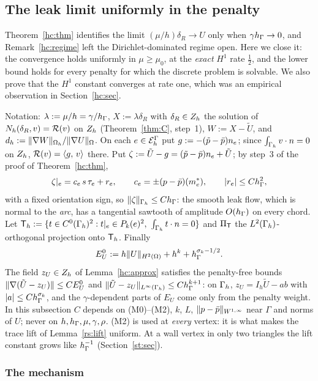 \subsection{The leak limit uniformly in the penalty}\label{u:sec}

Theorem~\ref{hc:thm} identifies the limit $(\mu/h)\delta_R\to U$ only when $\gamma h_\Gamma\to0$, and Remark~\ref{hc:regime} left the Dirichlet-dominated regime open. Here we close it: the convergence holds uniformly in $\mu\ge\mu_0$, at the \emph{exact} $H^1$ rate $\frac12$, and the lower bound holds for every penalty for which the discrete problem is solvable. We also prove that the $H^1$ constant converges at rate one, which was an empirical observation in Section~\ref{hc:sec}.

Notation: $\lambda:=\mu/h=\gamma/h_\Gamma$, $X:=\lambda\delta_R$ with $\delta_R\in Z_h$ the solution of $N_h(\delta_R,v)=\mathcal R(v)$ on $Z_h$ (Theorem~\ref{thm:C}, step~1), $W:=X-\tilde U$, and $d_h:=\lVert \nabla W\rVert_{\Omega_h}/\lVert \nabla U\rVert_\Omega$. On each $e\in\mathcal E_h^\Gamma$ put $g:=-(\tilde p-\bar p)n_e$; since $\int_{\Gamma_h}v\cdot n=0$ on $Z_h$, $\mathcal R(v)=\langle g,\, v\rangle$ there. Put $\zeta:=\tilde U-g=(\tilde p-\bar p)n_e+\tilde U$; by step~3 of the proof of Theorem~\ref{hc:thm},
\begin{equation}\label{u:zeta}
\zeta|_e=c_e\,s\,\tau_e+r_e,\qquad c_e=\pm(p-\bar p)(m_e^\ast),\qquad |r_e|\le Ch_\Gamma^2 ,
\end{equation}
with a fixed orientation sign, so $\lVert \zeta\rVert_{\Gamma_h}\le Ch_\Gamma$: the smooth leak flow, which is normal to the \emph{arc}, has a tangential sawtooth of amplitude $O(h_\Gamma)$ on every chord. Let $\Tsp:=\{t\in C^0(\Gh)^2:t|_e\in P_k(e)^2,\ \int_{\Gh}t\cdot n=0\}$ and $\Pi_{\mathsf T}$ the $L^2(\Gamma_h)$-orthogonal projection onto $\mathsf T_h$. Finally
\[
E^0_U:=h\lVert U\rVert_{H^2(\Omega)}+h^k+h_\Gamma^{\sigma_k-1/2}.
\]
The field $z_U\in Z_h$ of Lemma~\ref{hc:approx} satisfies the penalty-free bounds $\lVert \nabla(\tilde U-z_U)\rVert\le CE^0_U$ and $\lVert \tilde U-z_U\rVert_{L^\infty(\Gamma_h)}\le Ch_\Gamma^{k+1}$: on $\Gamma_h$, $z_U=I_h\tilde U-ab$ with $|a|\le Ch_\Gamma^{\sigma_k}$, and the $\gamma$-dependent parts of $E_U$ come only from the penalty weight. In this subsection $C$ depends on (M0)--(M2), $k$, $L$, $\lVert p-\bar p\rVert_{W^{1,\infty}}$ near $\Gamma$ and norms of $U$; never on $h,h_\Gamma,\mu,\gamma,\rho$. (M2) is used at \emph{every} vertex: it is what makes the trace lift of Lemma~\ref{rs:lift} uniform. At a wall vertex in only two triangles the lift constant grows like $h_\Gamma^{-1}$ (Section~\ref{st:sec}).

\subsubsection{The mechanism}

